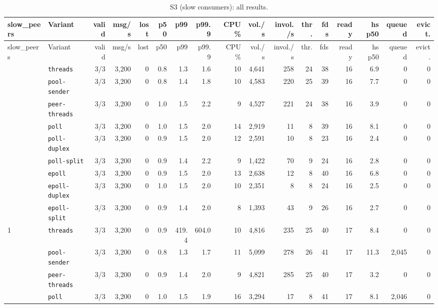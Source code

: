 \begin{longtable}{@{}llrrrrrrrrrrrrrrr@{}}
\caption{S3 (slow consumers): all results.}\label{tab:full-S3}\\
\toprule
slow\_peers & Variant & valid & msg/s & lost & p50 & p99 & p99.9 & CPU \% & vol./s & invol./s & thr. & fds & ready & hs p50 & queued & evict. \\
\midrule
\endfirsthead
\toprule
slow\_peers & Variant & valid & msg/s & lost & p50 & p99 & p99.9 & CPU \% & vol./s & invol./s & thr. & fds & ready & hs p50 & queued & evict. \\
\midrule
\endhead
\bottomrule
\endfoot
0 & \texttt{threads} & 3/3 & 3{,}200 & 0 & 0.8 & 1.3 & 1.6 & 10 & 4{,}641 & 258 & 24 & 38 & 16 & 6.9 & 0 & 0 \\
 & \texttt{pool-sender} & 3/3 & 3{,}200 & 0 & 0.8 & 1.4 & 1.8 & 10 & 4{,}583 & 220 & 25 & 39 & 16 & 7.7 & 0 & 0 \\
 & \texttt{peer-threads} & 3/3 & 3{,}200 & 0 & 1.0 & 1.5 & 2.2 & 9 & 4{,}527 & 221 & 24 & 38 & 16 & 3.9 & 0 & 0 \\
 & \texttt{poll} & 3/3 & 3{,}200 & 0 & 1.0 & 1.5 & 2.0 & 14 & 2{,}919 & 11 & 8 & 39 & 16 & 8.1 & 0 & 0 \\
 & \texttt{poll-duplex} & 3/3 & 3{,}200 & 0 & 0.9 & 1.5 & 2.0 & 12 & 2{,}591 & 10 & 8 & 23 & 16 & 2.4 & 0 & 0 \\
 & \texttt{poll-split} & 3/3 & 3{,}200 & 0 & 0.9 & 1.4 & 2.2 & 9 & 1{,}422 & 70 & 9 & 24 & 16 & 2.8 & 0 & 0 \\
 & \texttt{epoll} & 3/3 & 3{,}200 & 0 & 0.9 & 1.5 & 2.0 & 13 & 2{,}638 & 12 & 8 & 40 & 16 & 6.8 & 0 & 0 \\
 & \texttt{epoll-duplex} & 3/3 & 3{,}200 & 0 & 1.0 & 1.5 & 2.0 & 10 & 2{,}351 & 8 & 8 & 24 & 16 & 2.5 & 0 & 0 \\
 & \texttt{epoll-split} & 3/3 & 3{,}200 & 0 & 0.9 & 1.4 & 2.0 & 8 & 1{,}393 & 43 & 9 & 26 & 16 & 2.7 & 0 & 0 \\
\midrule
1 & \texttt{threads} & 3/3 & 3{,}200 & 0 & 0.9 & 419.4 & 604.0 & 10 & 4{,}816 & 235 & 25 & 40 & 17 & 8.4 & 0 & 0 \\
 & \texttt{pool-sender} & 3/3 & 3{,}200 & 0 & 0.8 & 1.3 & 1.7 & 11 & 5{,}099 & 278 & 26 & 41 & 17 & 11.3 & 2{,}045 & 0 \\
 & \texttt{peer-threads} & 3/3 & 3{,}200 & 0 & 0.9 & 1.4 & 2.0 & 9 & 4{,}821 & 285 & 25 & 40 & 17 & 3.2 & 0 & 0 \\
 & \texttt{poll} & 3/3 & 3{,}200 & 0 & 1.0 & 1.5 & 1.9 & 16 & 3{,}294 & 17 & 8 & 41 & 17 & 8.1 & 2{,}046 & 0 \\

\end{longtable}
